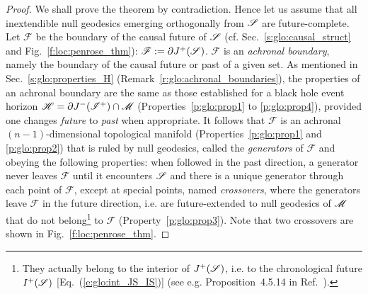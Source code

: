 \begin{proof}
We shall prove the theorem by contradiction. Hence let us assume that all
inextendible null geodesics emerging orthogonally from $\mathscr{S}$ are future-complete. Let $\mathscr{F}$
be the boundary of the causal future of $\mathscr{S}$
(cf. Sec.~\ref{s:glo:causal_struct} and Fig.~\ref{f:loc:penrose_thm}): $\mathscr{F} := \partial J^+(\mathscr{S})$.
$\mathscr{F}$ is an \emph{achronal boundary},
namely the boundary of the causal future or past of a given set.
As mentioned in Sec.~\ref{s:glo:properties_H} (Remark~\ref{r:glo:achronal_boundaries}),
the properties of an achronal boundary are the same as those established for a black hole event horizon
$\mathscr{H} = \partial J^-(\mathscr{I}^+) \cap \mathscr{M}$ (Properties~\ref{p:glo:prop1} to \ref{p:glo:prop4}),
provided one changes \emph{future} to \emph{past} when appropriate.
It follows that $\mathscr{F}$ is an achronal $(n-1)$-dimensional topological manifold
(Properties~\ref{p:glo:prop1} and \ref{p:glo:prop2}) that is ruled by null geodesics,
called the \emph{generators} of $\mathscr{F}$ and
obeying the following properties:
when followed in the past direction, a generator never leaves $\mathscr{F}$ until it encounters $\mathscr{S}$
and there is a unique generator through each point of $\mathscr{F}$, except at special
points, named \emph{crossovers}, where the generators leave
$\mathscr{F}$ in the future direction,
i.e. are future-extended to null geodesics of $\mathscr{M}$ that do not belong\footnote{They actually
belong to the interior of $J^+(\mathscr{S})$, i.e. to the chronological future $I^+(\mathscr{S})$
[Eq.~(\ref{e:glo:int_JS_IS})] (see e.g. Proposition~4.5.14 in Ref.~\cite{HawkiE73}).}
to $\mathscr{F}$ (Property~\ref{p:glo:prop3}). Note that two crossovers are shown in
Fig.~\ref{f:loc:penrose_thm}.


\end{proof}
